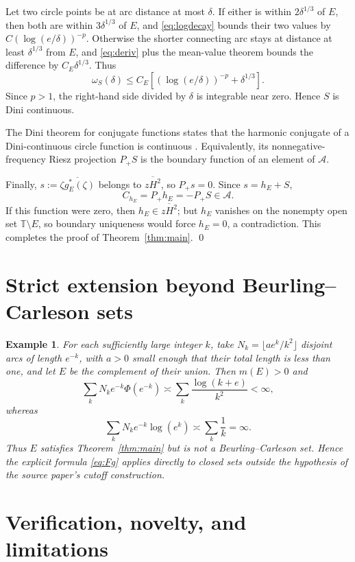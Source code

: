 \documentclass[11pt]{article}
\newtheorem{example}[theorem]{Example}
\newcommand{\T}{\mathbb T}
\newcommand{\A}{\mathcal A}
\newcommand{\m}{m}
\begin{document}
Let two circle points be at arc distance at most $\delta$.  If either is
within $2\delta^{1/3}$ of $E$, then both are within $3\delta^{1/3}$ of
$E$, and \eqref{eq:logdecay} bounds their two values by
$C(\log(e/\delta))^{-p}$.  Otherwise the shorter connecting arc stays at
distance at least $\delta^{1/3}$ from $E$, and \eqref{eq:deriv} plus the
mean-value theorem bounds the difference by $C_E\delta^{1/3}$.  Thus
\begin{equation}\label{eq:modulus}
 \omega_S(\delta)\leq C_E\left[
 (\log(e/\delta))^{-p}+\delta^{1/3}\right].
\end{equation}
Since $p>1$, the right-hand side divided by $\delta$ is integrable near
zero.  Hence $S$ is Dini continuous.

The Dini theorem for conjugate functions states that the harmonic conjugate
of a Dini-continuous circle function is continuous \cite[Chapter III]{Zyg}.
Equivalently, its nonnegative-frequency Riesz projection $P_+S$ is the
boundary function of an element of $\A$.

Finally, $s:=\overline{\zeta g_E^*(\zeta)}$ belongs to
$\overline{zH^2}$, so $P_+s=0$.  Since $s=h_E+S$,
\[
 C_{h_E}=P_+h_E=-P_+S\in\A.
\]
If this function were zero, then $h_E\in\overline{zH^2}$; but $h_E$
vanishes on the nonempty open set $\T\setminus E$, so boundary uniqueness
would force $h_E=0$, a contradiction.  This completes the proof of
Theorem~\ref{thm:main}. \qed

\section{Strict extension beyond Beurling--Carleson sets}

\begin{example}\label{ex:strict}
For each sufficiently large integer $k$, take
$N_k=\lfloor a e^k/k^2\rfloor$ disjoint arcs of length $e^{-k}$, with
$a>0$ small enough that their total length is less than one, and let $E$ be
the complement of their union.  Then $\m(E)>0$ and
\[
 \sum_kN_ke^{-k}\Phi(e^{-k})
 \asymp\sum_k\frac{\log(k+e)}{k^2}<\infty,
\]
whereas
\[
 \sum_kN_ke^{-k}\log(e^k)
 \asymp\sum_k\frac1k=\infty.
\]
Thus $E$ satisfies Theorem~\ref{thm:main} but is not a
Beurling--Carleson set.  Hence the explicit formula \eqref{eq:Fg} applies
directly to closed sets outside the hypothesis of the source paper's
cutoff construction.
\end{example}

\section{Verification, novelty, and limitations}
\end{document}
